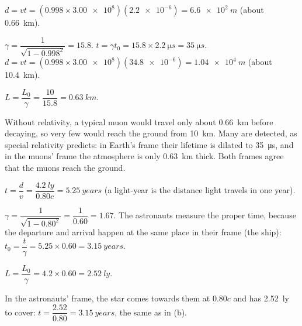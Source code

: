 \documentclass[12pt]{article}
\begin{document}
\ansq
{}
\begin{crit}
\end{crit}
\sample
$d = vt = (0.998 \times \num{3.00e8})(\num{2.2e-6}) = \qty{6.6e2}{m}$ (about \qty{0.66}{km}).
\begin{crit}
\end{crit}
\sample
$\gamma = \dfrac{1}{\sqrt{1 - 0.998^2}} = 15.8$. \quad $t = \gamma t_0 = 15.8 \times \qty{2.2}{\micro s}
= \qty{35}{\micro s}$. \quad $d = vt = (0.998 \times \num{3.00e8})(\num{34.8e-6}) = \qty{1.04e4}{m}$
(about \qty{10.4}{km}).
\begin{crit}
\end{crit}
\sample
$L = \dfrac{L_0}{\gamma} = \dfrac{10}{15.8} = \qty{0.63}{km}$.
\begin{crit}
\end{crit}
\sample
Without relativity, a typical muon would travel only about \qty{0.66}{km} before decaying, so very few
would reach the ground from \qty{10}{km}. Many are detected, as special relativity predicts: in Earth's
frame their lifetime is dilated to \qty{35}{\micro s}, and in the muons' frame the atmosphere is only
\qty{0.63}{km} thick. Both frames agree that the muons reach the ground.

\ansq
{}
\begin{crit}
\end{crit}
\sample
$t = \dfrac{d}{v} = \dfrac{\qty{4.2}{ly}}{0.80c} = \qty{5.25}{years}$ (a light-year is the distance light
travels in one year).
\begin{crit}
\end{crit}
\sample
$\gamma = \dfrac{1}{\sqrt{1 - 0.80^2}} = \dfrac{1}{0.60} = 1.67$. The astronauts measure the proper time,
because the departure and arrival happen at the same place in their frame (the ship):
$t_0 = \dfrac{t}{\gamma} = 5.25 \times 0.60 = \qty{3.15}{years}$.
\begin{crit}
\end{crit}
\sample
$L = \dfrac{L_0}{\gamma} = 4.2 \times 0.60 = \qty{2.52}{ly}$.
\begin{crit}
\end{crit}
\sample
In the astronauts' frame, the star comes towards them at $0.80c$ and has \qty{2.52}{ly} to cover:
$t = \dfrac{2.52}{0.80} = \qty{3.15}{years}$, the same as in (b).
\end{document}
